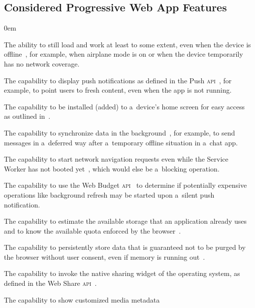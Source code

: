 \documentclass[sigconf]{acmart}
\begin{document}
\subsection{Considered Progressive Web App Features}

\begin{description}
  \itemsep0em 
  \item[Offline Capabilities] The ability to still load and work
    at least to some extent, even when the device is offline~\cite{russell2017serviceworkers},
    for example, when airplane mode is on or when the device temporarily has no network coverage.
  \item[Push Notifications] The capability to display push notifications as defined in
    the Push \textsc{api}~\cite{beverloo2017pushapi}, for example,
    to point users to fresh content, even when the app is not running.
  \item[Add to Home Screen] The capability to be installed (added) to a~device's home screen
    for easy access as outlined in~\cite{kinlan2017a2hs}.
  \item[Background Sync] The capability to synchronize data
    in the background~\cite{russell2017serviceworkers},
    for example, to send messages in a~deferred way
    after a~temporary offline situation in a~chat app.
  \item[Navigation Preload] The capability to start network navigation requests
    even while the Service Worker has not booted yet~\cite{archibald2017navigationpreload},
    which would else be a~blocking operation.
  \item[Silent Push] The capability to use the Web Budget
    \textsc{api}~\cite{beverloo2017budgetapi}
    to determine if potentially expensive operations
    like background refresh may be started
    upon a~silent push notification.
  \item[Storage Estimation] The capability to estimate the available storage
    that an application already uses and to know the available quota enforced by the
    browser~\cite{vankesteren2018storage}.
  \item[Persistent Storage] The capability to persistently store data
    that is guaranteed not to be purged by the browser without user consent,
    even if memory is running out~\cite{vankesteren2018storage}.
  \item[Web Share] The capability to invoke the native sharing widget
    of the operating system, as defined in the Web Share \textsc{api}~\cite{giuca2017webshare}.
  \item[Media Session] The capability to show customized media metadata

\end{description}
\end{document}
